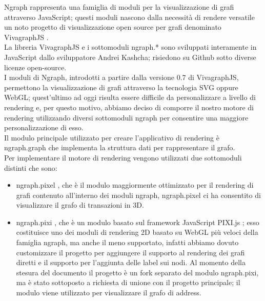 Ngraph \cite{vis:ngraph} rappresenta una famiglia di moduli per la visualizzazione di grafi attraverso JavaScript; questi moduli nascono dalla necessità di rendere versatile un noto progetto di visualizzazione open source per grafi denominato VivagraphJS \cite{vis:vivagraphjs}.\\
La libreria VivagraphJS e i sottomoduli ngraph.* sono sviluppati interamente in JavaScript dallo sviluppatore Andrei Kashcha; risiedono su Github sotto diverse licenze open-source.\\
I moduli di Ngraph, introdotti a partire dalla versione 0.7 di VivagraphJS, permettono la visualizzazione di grafi  attraverso la tecnologia SVG oppure WebGL; quest'ultimo ad oggi risulta essere difficile da personalizzare a livello di rendering e, per questo motivo, abbiamo deciso di comporre il nostro motore di rendering utilizzando diversi sottomoduli ngraph per consentire una maggiore personalizzazione di esso.\\
Il modulo principale utilizzato per creare l'applicativo di rendering è ngraph.graph \cite{vis:ngraph.graph} che implementa la struttura dati per rappresentare il grafo.\\
Per implementare il motore di rendering vengono utilizzati due sottomoduli distinti che sono:
\begin{itemize}
  \item ngraph.pixel \cite{vis:ngraph.pexel}, che è il modulo maggiormente ottimizzato per il rendering di grafi contenuto all'interno dei moduli ngraph, ngraph.pixel ci ha consentito di visualizzare il grafo di transazioni in 3D.
  \item ngraph.pixi \cite{vis:ngraph.pixi}, che è un modulo basato sul framework JavaScript PIXI.js \cite{vis:pixijs}; esso costituisce uno dei moduli di rendering 2D basato su WebGL più veloci della famiglia ngraph, ma anche il meno supportato, infatti abbiamo dovuto customizzare il progetto per aggiungere il supporto al rendering dei grafi diretti e il supporto per l'aggiunta delle label sui nodi. Al momento della stesura del documento il progetto è un fork separato del modulo ngraph.pixi, ma è stato sottoposto a richiesta di unione con il progetto principale; il modulo viene utilizzato per visualizzare il grafo di address.
\end{itemize}

